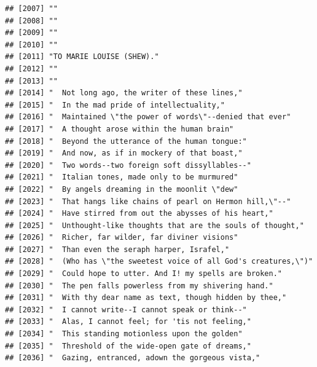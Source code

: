 \documentclass{article}\usepackage[]{graphicx}\usepackage[]{color}
\makeatletter
\newenvironment{kframe}{%
 \def\at@end@of@kframe{}%
 \ifinner\ifhmode%
  \def\at@end@of@kframe{\end{minipage}}%
  \begin{minipage}{\columnwidth}%
 \fi\fi%
 \def\FrameCommand##1{\hskip\@totalleftmargin \hskip-\fboxsep
 \colorbox{shadecolor}{##1}\hskip-\fboxsep
     \hskip-\linewidth \hskip-\@totalleftmargin \hskip\columnwidth}%
 \MakeFramed {\advance\hsize-\width
   \@totalleftmargin\z@ \linewidth\hsize
   \@setminipage}}%
 {\par\unskip\endMakeFramed%
 \at@end@of@kframe}
\newenvironment{knitrout}{}{} %
\makeatother
\begin{document}
\begin{knitrout}
\begin{kframe}
\begin{verbatim}
## [2007] ""                                                                            
## [2008] ""                                                                            
## [2009] ""                                                                            
## [2010] ""                                                                            
## [2011] "TO MARIE LOUISE (SHEW)."                                                     
## [2012] ""                                                                            
## [2013] ""                                                                            
## [2014] "  Not long ago, the writer of these lines,"                                  
## [2015] "  In the mad pride of intellectuality,"                                      
## [2016] "  Maintained \"the power of words\"--denied that ever"                       
## [2017] "  A thought arose within the human brain"                                    
## [2018] "  Beyond the utterance of the human tongue:"                                 
## [2019] "  And now, as if in mockery of that boast,"                                  
## [2020] "  Two words--two foreign soft dissyllables--"                                
## [2021] "  Italian tones, made only to be murmured"                                   
## [2022] "  By angels dreaming in the moonlit \"dew"                                   
## [2023] "  That hangs like chains of pearl on Hermon hill,\"--"                       
## [2024] "  Have stirred from out the abysses of his heart,"                           
## [2025] "  Unthought-like thoughts that are the souls of thought,"                    
## [2026] "  Richer, far wilder, far diviner visions"                                   
## [2027] "  Than even the seraph harper, Israfel,"                                     
## [2028] "  (Who has \"the sweetest voice of all God's creatures,\")"                  
## [2029] "  Could hope to utter. And I! my spells are broken."                         
## [2030] "  The pen falls powerless from my shivering hand."                           
## [2031] "  With thy dear name as text, though hidden by thee,"                        
## [2032] "  I cannot write--I cannot speak or think--"                                 
## [2033] "  Alas, I cannot feel; for 'tis not feeling,"                                
## [2034] "  This standing motionless upon the golden"                                  
## [2035] "  Threshold of the wide-open gate of dreams,"                                
## [2036] "  Gazing, entranced, adown the gorgeous vista,"                              

\end{verbatim}
\end{kframe}
\end{knitrout}
\end{document}
